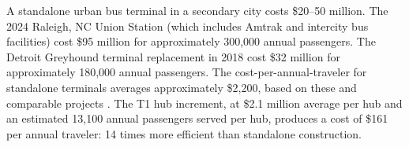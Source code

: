 A standalone urban bus terminal in a secondary city costs \$20--50 million. The 2024 Raleigh, NC Union Station (which includes Amtrak and intercity bus facilities) cost \$95 million for approximately 300,000 annual passengers. The Detroit Greyhound terminal replacement in 2018 cost \$32 million for approximately 180,000 annual passengers. The cost-per-annual-traveler for standalone terminals averages approximately \$2,200, based on these and comparable projects \citep{Amtrak2023,BTS_intermodal2023}. The T1 hub increment, at \$2.1 million average per hub and an estimated 13,100 annual passengers served per hub, produces a cost of \$161 per annual traveler: 14 times more efficient than standalone construction.
